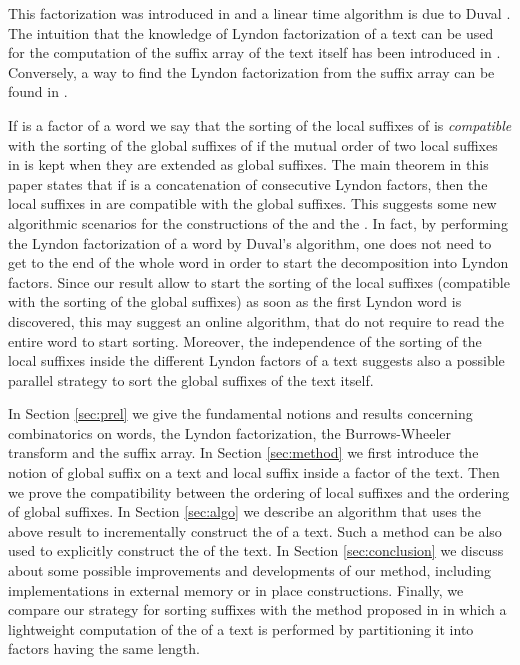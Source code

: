 \documentclass[envcountsame,runningheads]{llncs}
\begin{document}
This factorization was introduced in \cite{ChenFoxLyndon1958} and a linear time algorithm is due to Duval \cite{Duval1983}.
The intuition that the knowledge of Lyndon factorization of a text can be used for the computation of the suffix array of the text itself has been introduced in \cite{BonomoMRRSDLT2013}. Conversely, a way to find the Lyndon factorization from the suffix array can be found in \cite{HohlwegReutenauer2003}.

If  is a factor of a word  we say that the sorting of the local suffixes of  is \emph{compatible} with the sorting of the global suffixes of  if the mutual order of two local suffixes in  is kept when they are extended as global suffixes. The main theorem in this paper states that if  is a concatenation of consecutive Lyndon factors, then the local suffixes in  are compatible with the global suffixes. This suggests some new algorithmic scenarios for the constructions of the  and the . In fact, by performing the Lyndon factorization of a word  by Duval's algorithm, one does not need to get to the end of the whole word in order to start the decomposition into Lyndon factors. Since our result allow to start the sorting of the local suffixes (compatible with the sorting of the global suffixes) as soon as the first Lyndon word is discovered, this may suggest an online algorithm, that do not require to read the entire word to start sorting. Moreover, the independence of the sorting of the local suffixes inside the different Lyndon factors of a text suggests also a possible parallel strategy to sort the global suffixes of the text itself.

In Section \ref{sec:prel} we give the fundamental notions and results concerning combinatorics on words, the Lyndon factorization, the Burrows-Wheeler transform and the suffix array. In Section \ref{sec:method} we first introduce the notion of global suffix on a text and local suffix inside a factor of the text. Then we prove the compatibility between the ordering of local suffixes and the ordering of global suffixes.
In Section \ref{sec:algo} we describe an algorithm that uses the above result to incrementally construct the  of a text. Such a method can be also used to explicitly construct the  of the text.
In Section \ref{sec:conclusion} we discuss about some possible improvements and developments of our method, including implementations in external memory or in place constructions. Finally, we compare our strategy for sorting suffixes with the method proposed in \cite{FerraginaGagieManzini2012} in which a lightweight computation of the  of a text is performed by partitioning it into factors having the same length.
\end{document}
